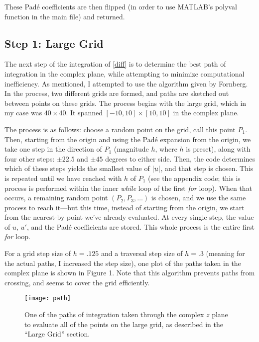 \documentclass[12pt]{article}
\begin{document}
These Pad\'{e} coefficients are then flipped (in order to use MATLAB's polyval function in the main file) and returned. 

\subsection{ Step 1: Large Grid }
The next step of the integration of \eqref{diff} is to determine the best path of integration in the complex plane, while attempting to minimize computational inefficiency. As mentioned, I attempted to use the algorithm given by Fornberg. In the process, two different grids are formed, and paths are sketched out between points on these grids. The process begins with the large grid, which in my case was $40 \times 40$. It spanned $[-10,10] \times [10,10]$ in the complex plane. 

The process is as follows: choose a random point on the grid, call this point $P_1$. Then, starting from the origin and using the Pad\'{e} expansion from the origin, we take one step in the direction of $P_1$ (magnitude $h$, where $h$ is preset), along with four other steps: $\pm 22.5$ and $\pm 45$ degrees to either side. Then, the code determines which of these steps yields the smallest value of $\abs{u}$, and that step is chosen. This is repeated until we have reached with $h$ of $P_1$ (see the appendix code; this is process is performed within the inner \emph{while} loop of the first \emph{for} loop). When that occurs, a remaining random point $(P_2, P_3, \dots)$ is chosen, and we use the same process to reach it---but this time, instead of starting from the origin, we start from the nearest-by point we've already evaluated. At every single step, the value of $u$, $u'$, and the Pad\'{e} coefficients are stored. This whole process is the entire first \emph{for} loop. 

For a grid step size of $h = .125$ and a traversal step size of $h = .3$ (meaning for the actual paths, I increased the step size), one plot of the paths taken in the complex plane is shown in Figure 1. Note that this algorithm prevents paths from crossing, and seems to cover the grid efficiently. 

\begin{figure}[h]
 \centering 
 \texttt{[image: path]}
 \caption{One of the paths of integration taken through the complex $z$ plane to evaluate all of the points on the large grid, as described in the ``Large Grid'' section.}
\end{figure}
\end{document}
